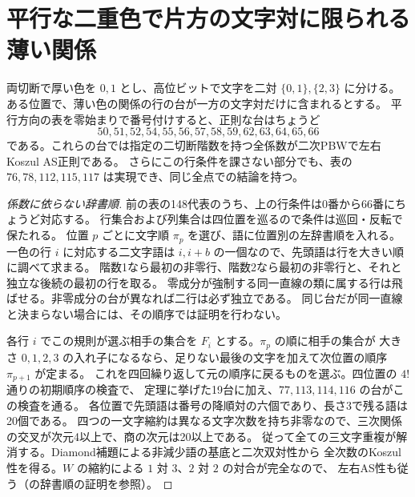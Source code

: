 \section{平行な二重色で片方の文字対に限られる薄い関係}
\label{sec:klein-parallel-flags}
\begin{theorem}\label{thm:klein-parallel-flags}
両切断で厚い色を $0,1$ とし、高位ビットで文字を二対 $\{0,1\},\{2,3\}$ に分ける。
ある位置で、薄い色の関係の行の台が一方の文字対だけに含まれるとする。
平行方向の表を零始まりで番号付けすると、正則な台はちょうど
\[
 50,51,52,54,55,56,57,58,59,62,63,64,65,66
\]
である。これらの台では指定の二切断階数を持つ全係数が二次PBWで左右Koszul AS正則である。
さらにこの行条件を課さない部分でも、表の $76,78,112,115,117$ は実現でき、同じ全点での結論を持つ。
\end{theorem}
\begin{proof}[係数に依らない辞書順]
前の表の148代表のうち、上の行条件は0番から66番にちょうど対応する。
行集合および列集合は四位置を巡るので条件は巡回・反転で保たれる。
位置 $p$ ごとに文字順 $\pi_p$ を選び、語に位置別の左辞書順を入れる。
一色の行 $i$ に対応する二文字語は $i,i+b$ の一個なので、先頭語は行を大きい順に調べて求まる。
階数1なら最初の非零行、階数2なら最初の非零行と、それと独立な後続の最初の行を取る。
零成分が強制する同一直線の類に属する行は飛ばせる。非零成分の台が異なれば二行は必ず独立である。
同じ台だが同一直線と決まらない場合には、その順序では証明を行わない。

各行 $i$ でこの規則が選ぶ相手の集合を $F_i$ とする。$\pi_p$ の順に相手の集合が
大きさ $0,1,2,3$ の入れ子になるなら、足りない最後の文字を加えて次位置の順序 $\pi_{p+1}$ が定まる。
これを四回繰り返して元の順序に戻るものを選ぶ。四位置の $4!$ 通りの初期順序の検査で、
定理に挙げた19台に加え、$77,113,114,116$ の台がこの検査を通る。
各位置で先頭語は番号の降順対の六個であり、長さ3で残る語は20個である。
四つの一文字縮約は異なる文字次数を持ち非零なので、三次関係の交叉が次元4以上で、商の次元は20以上である。
従って全ての三文字重複が解消する。Diamond補題による非減少語の基底と二次双対性から
全次数のKoszul性を得る。$W$ の縮約による $1$ 対 $3$、$2$ 対 $2$ の対合が完全なので、
左右AS性も従う（の辞書順の証明を参照）。
\end{proof}

